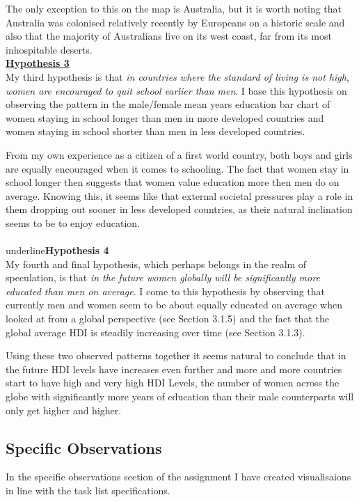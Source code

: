 \documentclass[11pt,a4paper,final]{article}
\begin{document}
\begin{multicols}{2}
The only exception to this on the map is Australia, but it is worth noting that Australia was colonised relatively recently by Europeans on a historic scale and also that the majority of Australians live on its west coast, far from its most inhospitable deserts.
\\
\underline{\textbf{Hypothesis 3}}
\\
My third hypothesis is that \emph{in countries where the standard of living is not high, women are encouraged to quit school earlier than men}. I base this hypothesis on observing the pattern in the male/female mean years education bar chart of women staying in school longer than men in more developed countries and women staying in school shorter than men in less developed countries.

From my own experience as a citizen of a first world country, both boys and girls are equally encouraged when it comes to schooling. The fact that women stay in school longer then suggests that women value education more then men do on average. Knowing this, it seems like that external societal pressures play a role in them dropping out sooner in less developed countries, as their natural inclination seems to be to enjoy education.
\\
\\underline{\textbf{Hypothesis 4}}
\\
My fourth and final hypothesis, which perhaps belongs in the realm of speculation, is that \emph{in the future women globally will be significantly more educated than men on average}. I come to this hypothesis by observing that currently men and women seem to be about equally educated on average when looked at from a global perspective (see Section 3.1.5) and the fact that the global average HDI is steadily increasing over time (see Section 3.1.3).

Using these two observed patterns together it seems natural to conclude that in the future HDI levels have increases even further and more and more countries start to have high and very high HDI Levels, the number of women across the globe with significantly more years of education than their male counterparts will only get higher and higher.

\subsection{Specific Observations}
In the specific observations section of the assignment I have created visualisaions in line with the task list specifications.


\end{multicols}
\end{document}
